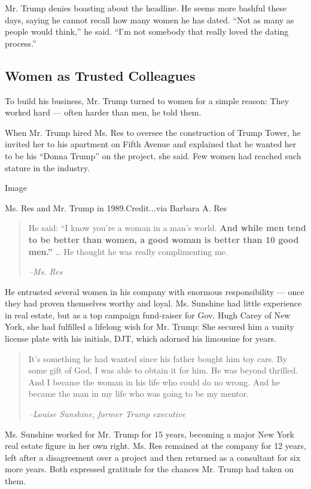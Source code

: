 Mr. Trump denies boasting about the headline. He seems more bashful
these days, saying he cannot recall how many women he has dated. ``Not
as many as people would think,'' he said. ``I'm not somebody that really
loved the dating process.''

\hypertarget{women-as-trusted-colleagues}{%
\subsection{Women as Trusted
Colleagues}\label{women-as-trusted-colleagues}}

To build his business, Mr. Trump turned to women for a simple reason:
They worked hard --- often harder than men, he told them.

When Mr. Trump hired Ms. Res to oversee the construction of Trump Tower,
he invited her to his apartment on Fifth Avenue and explained that he
wanted her to be his ``Donna Trump'' on the project, she said. Few women
had reached such stature in the industry.

Image

Ms. Res and Mr. Trump in 1989.Credit...via Barbara A. Res

\begin{quote}
He said: ``I know you're a woman in a man's world. \textbf{And while men
tend to be better than women, a good woman is better than 10 good
men.''} \ldots{} He thought he was really complimenting me.

\emph{--Ms. Res}
\end{quote}

He entrusted several women in his company with enormous responsibility
--- once they had proven themselves worthy and loyal. Ms. Sunshine had
little experience in real estate, but as a top campaign fund-raiser for
Gov. Hugh Carey of New York, she had fulfilled a lifelong wish for Mr.
Trump: She secured him a vanity license plate with his initials, DJT,
which adorned his limousine for years.

\begin{quote}
It's something he had wanted since his father bought him toy cars. By
some gift of God, I was able to obtain it for him. He was beyond
thrilled. And I became the woman in his life who could do no wrong. And
he became the man in my life who was going to be my mentor.

\emph{--Louise Sunshine, former Trump executive}
\end{quote}

Ms. Sunshine worked for Mr. Trump for 15 years, becoming a major New
York real estate figure in her own right. Ms. Res remained at the
company for 12 years, left after a disagreement over a project and then
returned as a consultant for six more years. Both expressed gratitude
for the chances Mr. Trump had taken on them.

